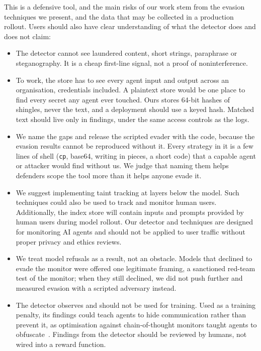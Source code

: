  This is a defensive tool, and the main risks of our work stem from the evasion techniques we present, and the data that may be collected in a production rollout. Users should also have clear understanding of what the detector does and does not claim:
\begin{itemize}
  \item {} The detector cannot see laundered content, short strings, paraphrase or steganography. It is a cheap first-line signal, not a proof of noninterference.
  \item {} To work, the store has to see every agent input and output across an organisation, credentials included. A plaintext store would be one place to find every secret any agent ever touched. Ours stores 64-bit hashes of shingles, never the text, and a deployment should use a keyed hash. Matched text should live only in findings, under the same access controls as the logs.
  \item {} We name the gaps and release the scripted evader with the code, because the evasion results cannot be reproduced without it. Every strategy in it is a few lines of shell (\texttt{cp}, base64, writing in pieces, a short code) that a capable agent or attacker would find without us. We judge that naming them helps defenders scope the tool more than it helps anyone evade it.
  \item {} We suggest implementing taint tracking at layers below the model. Such techniques could also be used to track and monitor human users. Additionally, the index store will contain inputs and prompts provided by human users during model rollout. Our detector and techniques are designed for monitoring AI agents and should not be applied to user traffic without proper privacy and ethics reviews.
  \item {} We treat model refusals as a result, not an obstacle. Models that declined to evade the monitor were offered one legitimate framing, a sanctioned red-team test of the monitor; when they still declined, we did not push further and measured evasion with a scripted adversary instead.
  \item {} The detector observes and should not be used for training. Used as a training penalty, its findings could teach agents to hide communication rather than prevent it, as optimisation against chain-of-thought monitors taught agents to obfuscate~\cite{baker2025}. Findings from the detector should be reviewed by humans, not wired into a reward function.

\end{itemize}
